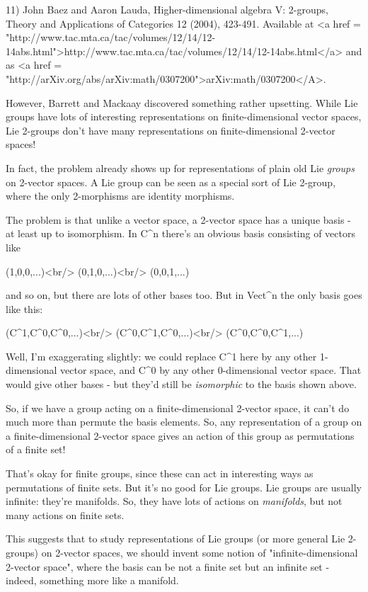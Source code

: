 11) John Baez and Aaron Lauda, Higher-dimensional algebra V: 2-groups,
Theory and Applications of Categories 12 (2004), 423-491.  Available
at <a href =
"http://www.tac.mta.ca/tac/volumes/12/14/12-14abs.html">http://www.tac.mta.ca/tac/volumes/12/14/12-14abs.html</a>
and as <a href =
"http://arXiv.org/abs/arXiv:math/0307200">arXiv:math/0307200</A>.

However, Barrett and Mackaay discovered something rather upsetting.
While Lie groups have lots of interesting representations on
finite-dimensional vector spaces, Lie 2-groups don't have many
representations on finite-dimensional 2-vector spaces!  

In fact, the problem already shows up for representations of
plain old Lie \emph{groups} on 2-vector spaces.  A Lie group can be
seen as a special sort of Lie 2-group, where the only 2-morphisms 
are identity morphisms.

The problem is that unlike a vector space, a 2-vector space has 
a unique basis - at least up to isomorphism.  In C^{n} there's 
an obvious basis consisting of vectors like

(1,0,0,...)<br/>
(0,1,0,...)<br/>
(0,0,1,...)

and so on, but there are lots of other bases too.  But in
Vect^{n} the only basis goes like this:

(C^{1},C^{0},C^{0},...)<br/>
(C^{0},C^{1},C^{0},...)<br/>
(C^{0},C^{0},C^{1},...)

Well, I'm exaggerating slightly: we could replace C^{1} here
by any other 1-dimensional vector space, and C^{0} by any
other 0-dimensional vector space.  That would give other bases - but
they'd still be \emph{isomorphic} to the basis shown above.

So, if we have a group acting on a finite-dimensional 2-vector space, 
it can't do much more than permute the basis elements.  So, any 
representation of a group on a finite-dimensional 2-vector space gives 
an action of this group as permutations of a finite set!

That's okay for finite groups, since these can act in interesting ways
as permutations of finite sets.  But it's no good for Lie groups.  Lie
groups are usually infinite: they're manifolds.  So, they have lots of
actions on \emph{manifolds}, but not many actions on finite sets.

This suggests that to study representations of Lie groups (or more
general Lie 2-groups) on 2-vector spaces, we should invent some notion
of "infinite-dimensional 2-vector space", where the basis
can be not a finite set but an infinite set - indeed, something more
like a manifold.

